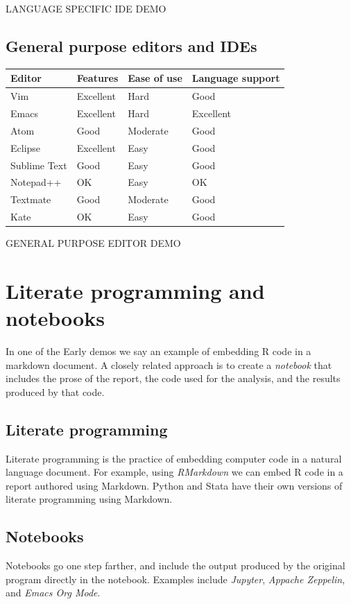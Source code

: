 \documentclass[]{book}
\begin{document}
LANGUAGE SPECIFIC IDE DEMO

\subsection{General purpose editors and
IDEs}\label{general-purpose-editors-and-ides}

\begin{longtable}[]{@{}llll@{}}
\toprule
Editor & Features & Ease of use & Language support\tabularnewline
\midrule
\endhead
Vim & Excellent & Hard & Good\tabularnewline
Emacs & Excellent & Hard & Excellent\tabularnewline
Atom & Good & Moderate & Good\tabularnewline
Eclipse & Excellent & Easy & Good\tabularnewline
Sublime Text & Good & Easy & Good\tabularnewline
Notepad++ & OK & Easy & OK\tabularnewline
Textmate & Good & Moderate & Good\tabularnewline
Kate & OK & Easy & Good\tabularnewline
\bottomrule
\end{longtable}

GENERAL PURPOSE EDITOR DEMO

\section{Literate programming and
notebooks}\label{literate-programming-and-notebooks}

In one of the Early demos we say an example of embedding R code in a
markdown document. A closely related approach is to create a
\emph{notebook} that includes the prose of the report, the code used for
the analysis, and the results produced by that code.

\subsection{Literate programming}\label{literate-programming}

Literate programming is the practice of embedding computer code in a
natural language document. For example, using \emph{RMarkdown} we can
embed R code in a report authored using Markdown. Python and Stata have
their own versions of literate programming using Markdown.

\subsection{Notebooks}\label{notebooks}

Notebooks go one step farther, and include the output produced by the
original program directly in the notebook. Examples include
\emph{Jupyter}, \emph{Appache Zeppelin}, and \emph{Emacs Org Mode}.
\end{document}
